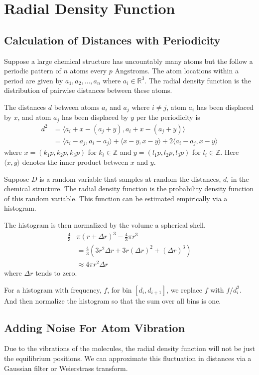 \documentclass[12pt,letterpaper]{article}
\begin{document}
\tableofcontents
\setlength{\parindent}{0.25in}
\setlength{\floatsep}{0in}
\section{Radial Density Function}
\subsection{Calculation of Distances with Periodicity}
Suppose a large chemical structure has uncountably many atoms but the follow a
periodic pattern of $n$ atoms every $p$ Angstroms. The atom locations within a
period are given by $a_1, a_2, \ldots, a_n$ where $a_i \in \mathbb{R}^3$. The
radial density function is the distribution of pairwise distances between these
atoms.

The distances $d$ between atoms $a_i$ and $a_j$ where $i \neq j$, atom $a_i$
has been displaced by $x$, and atom $a_j$ has been displaced by $y$ per the
periodicity is 
\begin{align*}
  d^2 &= \langle a_i + x - (a_j + y), a_i + x - (a_j + y) \rangle \\
      &= \langle a_i-a_j, a_i-a_j \rangle  + \langle x-y, x-y \rangle  
      + 2 \langle a_i-a_j,x-y \rangle 
\end{align*}
where $x =(k_1 p, k_2 p, k_3 p)$ for $k_i \in \mathbb{Z}$ 
and $y = (l_1 p, l_2 p, l_3 p)$ for $l_i \in \mathbb{Z}$.
Here $\langle x,y \rangle $ denotes the inner product between $x$ and $y$. 

Suppose $D$ is a random variable that samples at random the distances, $d$, in
the chemical structure. The radial density function is the probability density
function of this random variable. This function can be estimated empirically via
a histogram.

The histogram is then normalized by the volume a spherical shell.
\begin{align*}
  \frac{4}{3} &\pi (r + \Delta r)^3 - \frac{4}{3} \pi r^3\\
     &=\frac{4}{3} (3 r^2 \Delta r + 3 r (\Delta r)^2 + (\Delta r)^3) \\
              &\approx 4 \pi r^2 \Delta r
\end{align*}
where $\Delta r$ tends to zero.

For a histogram with frequency, $f$, for bin $[d_i, d_{i+1}]$, we replace $f$
with $f / d_i^2$. And then normalize the histogram so that the sum over all bins
is one.

\subsection{Adding Noise For Atom Vibration}
Due to the vibrations of the molecules, the radial density function will not be
just the equilibrium positions. We can approximate this fluctuation in distances
via a Gaussian filter or Weierstrass transform.
\end{document}
